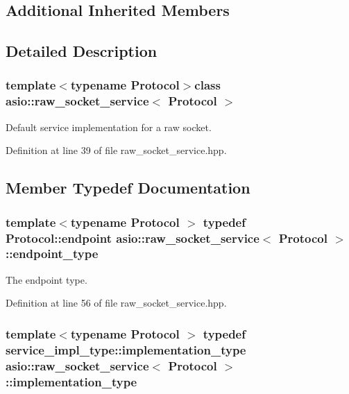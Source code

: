 \subsection*{Additional Inherited Members}


\subsection{Detailed Description}
\subsubsection*{template$<$typename Protocol$>$class asio\+::raw\+\_\+socket\+\_\+service$<$ Protocol $>$}

Default service implementation for a raw socket. 

Definition at line 39 of file raw\+\_\+socket\+\_\+service.\+hpp.



\subsection{Member Typedef Documentation}
\hypertarget{classasio_1_1raw__socket__service_a8278f352f4e4424d431320f924e8b496}{}
\subsubsection[{endpoint\+\_\+type}]{\setlength{\rightskip}{0pt plus 5cm}template$<$typename Protocol $>$ typedef Protocol\+::endpoint {\bf asio\+::raw\+\_\+socket\+\_\+service}$<$ Protocol $>$\+::{\bf endpoint\+\_\+type}}\label{classasio_1_1raw__socket__service_a8278f352f4e4424d431320f924e8b496}


The endpoint type. 



Definition at line 56 of file raw\+\_\+socket\+\_\+service.\+hpp.

\hypertarget{classasio_1_1raw__socket__service_aa2e0ef73d6504fbcab510cb835e9e3d9}{}
\subsubsection[{implementation\+\_\+type}]{\setlength{\rightskip}{0pt plus 5cm}template$<$typename Protocol $>$ typedef {\bf service\+\_\+impl\+\_\+type\+::implementation\+\_\+type} {\bf asio\+::raw\+\_\+socket\+\_\+service}$<$ Protocol $>$\+::{\bf implementation\+\_\+type}}\label{classasio_1_1raw__socket__service_aa2e0ef73d6504fbcab510cb835e9e3d9}


